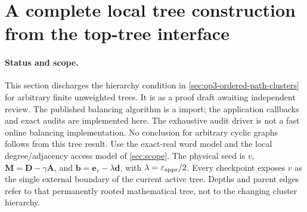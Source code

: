 \section[Complete local tree construction]{A complete local tree construction from the top-tree interface}
\label{sec:op3-local-top-trees}

\paragraph{Status and scope.}
This section discharges the hierarchy condition in
\cref{sec:op3-ordered-path-clusters} for arbitrary finite unweighted trees.
It is \statusproved{} as a proof draft awaiting independent review. The
published balancing algorithm is a \statussource{} import; the application
callbacks and exact audits are implemented here. The exhaustive audit driver
is not a fast online balancing implementation. No conclusion for arbitrary
cyclic graphs follows from this tree result.
Use the exact-real word model and the local degree/adjacency access model of
\cref{sec:scope}. The physical seed is $v$,
$\boldsymbol M=\boldsymbol D-\gamma\boldsymbol A$, and
$\boldsymbol b=\boldsymbol e_v-\lambda\boldsymbol d$, with
$\lambda=\varepsilon_{\mathrm{appr}}/2$. Every checkpoint exposes $v$ as the single external
boundary of the current active tree. Depths and parent edges refer to that
permanently rooted mathematical tree, not to the changing cluster hierarchy.

